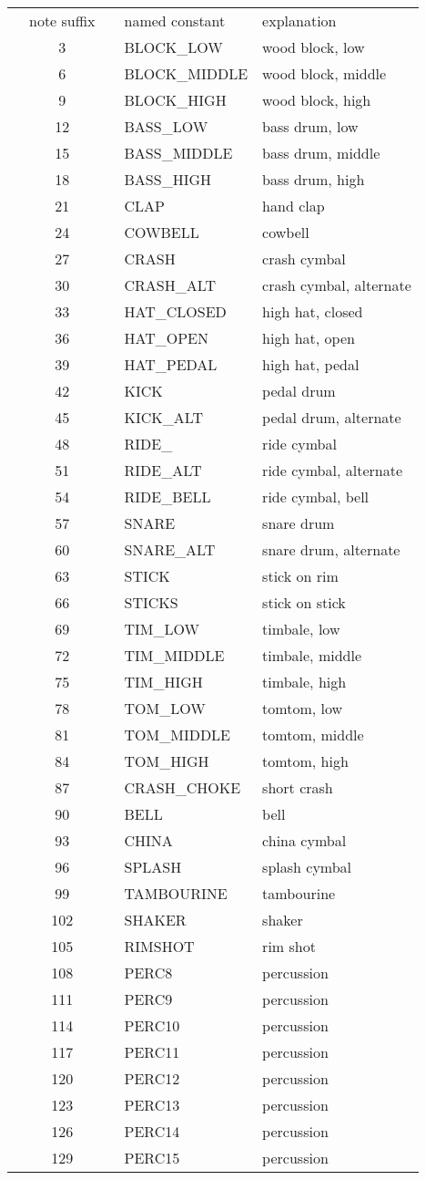 \documentclass{article}
\begin{document}
\begin{tabular}{cll}
~~note suffix~~ & named constant~~~ & explanation\\
3 & BLOCK\_LOW & wood block, low\\
6 & BLOCK\_MIDDLE & wood block, middle\\
9 & BLOCK\_HIGH & wood block, high\\
12 & BASS\_LOW & bass drum, low\\
15 & BASS\_MIDDLE & bass drum, middle\\
18 & BASS\_HIGH & bass drum, high\\
21 & CLAP & hand clap\\
24 & COWBELL & cowbell\\
27 & CRASH & crash cymbal\\
30 & CRASH\_ALT & crash cymbal, alternate\\
33 & HAT\_CLOSED & high hat, closed\\
36 & HAT\_OPEN & high hat, open\\
39 & HAT\_PEDAL & high hat, pedal\\
42 & KICK & pedal drum\\
45 & KICK\_ALT & pedal drum, alternate\\
48 & RIDE\_ & ride cymbal\\
51 & RIDE\_ALT & ride cymbal, alternate\\
54 & RIDE\_BELL & ride cymbal, bell\\
57 & SNARE & snare drum\\
60 & SNARE\_ALT & snare drum, alternate\\
63 & STICK & stick on rim\\
66 & STICKS & stick on stick\\
69 & TIM\_LOW & timbale, low\\
72 & TIM\_MIDDLE & timbale, middle\\
75 & TIM\_HIGH & timbale, high\\
78 & TOM\_LOW & tomtom, low\\
81 & TOM\_MIDDLE & tomtom, middle\\
84 & TOM\_HIGH & tomtom, high\\
87 & CRASH\_CHOKE & short crash\\
90 & BELL & bell\\
93 & CHINA & china cymbal\\
96 & SPLASH & splash cymbal\\
99 & TAMBOURINE & tambourine\\
102 & SHAKER & shaker\\
105 & RIMSHOT & rim shot\\
108 & PERC8 & percussion\\
111 & PERC9 & percussion\\
114 & PERC10 & percussion\\
117 & PERC11 & percussion\\
120 & PERC12 & percussion\\
123 & PERC13 & percussion\\
126 & PERC14 & percussion\\
129 & PERC15 & percussion\\
\end{tabular}
\end{document}
